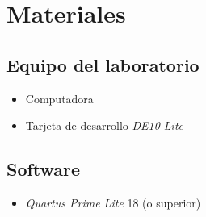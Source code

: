 \documentclass[../main.tex]{subfiles}
\begin{document}
\section{Materiales}
\subsection*{Equipo del laboratorio}
\begin{itemize}
  \item Computadora
  \item Tarjeta de desarrollo \textit{DE10-Lite}
\end{itemize}
\subsection*{Software}
\begin{itemize}
  \item \textit{Quartus Prime Lite} 18 (o superior)
\end{itemize}
\end{document}
